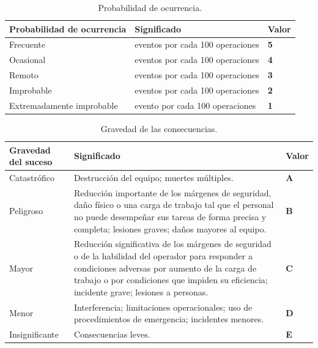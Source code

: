 \begin{table}[H]
\centering
\renewcommand{\arraystretch}{1.4}
\begin{tabularx}{\textwidth}{|>{\RaggedRight\arraybackslash}p{4.4cm}|>{\centering\arraybackslash}X|>{\centering\arraybackslash}p{2cm}|}
\hline
\rowcolor[gray]{0.9}\textbf{Probabilidad de ocurrencia} & \textbf{Significado} & \textbf{Valor} \\ \hline
Frecuente & 70 eventos por cada 100 operaciones & \textbf{5} \\ \hline
Ocasional & 50 eventos por cada 100 operaciones & \textbf{4} \\ \hline
Remoto & 25 eventos por cada 100 operaciones & \textbf{3} \\ \hline
Improbable & 10 eventos por cada 100 operaciones & \textbf{2} \\ \hline
Extremadamente improbable & 1 evento por cada 100 operaciones & \textbf{1} \\ \hline
\end{tabularx}
\caption{Probabilidad de ocurrencia.}
\end{table}


\begin{table}[H]
\centering
\renewcommand{\arraystretch}{1.3}
\begin{tabularx}{\textwidth}{|>{\RaggedRight\arraybackslash}p{3cm}|>{\RaggedRight\arraybackslash}X|>{\centering\arraybackslash}p{1.6cm}|}
\hline
\rowcolor[gray]{0.9}\textbf{Gravedad del suceso} & \textbf{Significado} & \textbf{Valor} \\ \hline
Catastrófico & Destrucción del equipo; muertes múltiples. & \textbf{A} \\ \hline
Peligroso & Reducción importante de los márgenes de seguridad, daño físico o una carga de trabajo tal que el personal no puede desempeñar sus tareas de forma precisa y completa; lesiones graves; daños mayores al equipo. & \textbf{B} \\ \hline
Mayor & Reducción significativa de los márgenes de seguridad o de la habilidad del operador para responder a condiciones adversas por aumento de la carga de trabajo o por condiciones que impiden su eficiencia; incidente grave; lesiones a personas. & \textbf{C} \\ \hline
Menor & Interferencia; limitaciones operacionales; uso de procedimientos de emergencia; incidentes menores. & \textbf{D} \\ \hline
Insignificante & Consecuencias leves. & \textbf{E} \\ \hline
\end{tabularx}
\caption{Gravedad de las consecuencias.}
\end{table}


